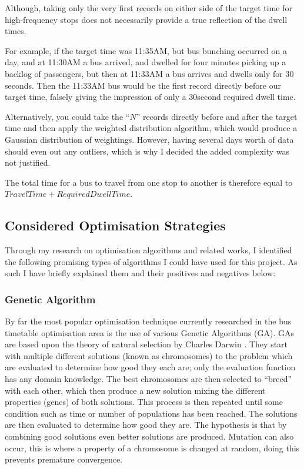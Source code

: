 \documentclass{article}
\begin{document}
\par 
Although, taking only the very first records on either side of the target time for high-frequency stops does not necessarily provide a true reflection of the dwell times. 

\par
For example, if the target time was 11:35AM, but bus bunching occurred on a day, and at 11:30AM a bus arrived, and dwelled for four minutes picking up a backlog of passengers, but then at 11:33AM a bus arrives and dwells only for 30 seconds. Then the 11:33AM bus would be the first record directly before our target time, falsely giving the impression of only a 30second required dwell time. 

\par 
Alternatively, you could take the ``$N$'' records directly before and after the target time and then apply the weighted distribution algorithm, which would produce a Gaussian distribution of weightings. However, having several days worth of data should even out any outliers, which is why I decided the added complexity was not justified. 

\par 

The total time for a bus to travel from one stop to another is therefore equal to \( Travel Time + Required Dwell Time\). 





\subsection{Considered Optimisation Strategies}
\label{strats}
Through my research on optimisation algorithms and related works, I identified the following promising types of algorithms I could have used for this project. As such I have briefly explained them and their positives and negatives below:

\subsubsection{Genetic Algorithm}
By far the most popular optimisation technique currently researched in the bus timetable optimisation area is the use of various Genetic Algorithms (GA). GAs are based upon the theory of natural selection by Charles Darwin \cite{RN35}. They start with multiple different solutions (known as chromosomes) to the problem which are evaluated to determine how good they each are; only the evaluation function has any domain knowledge. The best chromosomes are then selected to ``breed'' with each other, which then produce a new solution mixing the different properties (genes) of both solutions. This process is then repeated until some condition such as time or number of populations has been reached. The solutions are then evaluated to determine how good they are. The hypothesis is that by combining good solutions even better solutions are produced. Mutation can also occur, this is where a property of a chromosome is changed at random, doing this prevents premature convergence.
\end{document}
